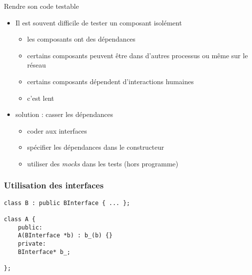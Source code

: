 \begin{frame}{Rendre son code testable}

\begin{itemize}
\itemsep1pt\parskip0pt
\item
  Il est souvent difficile de tester un composant isolément

  \begin{itemize}
  \itemsep1pt\parskip0pt
  \item
    les composants ont des dépendances
  \item
    certains composants peuvent être dans d'autres processus ou même sur
    le réseau
  \item
    certains composants  dépendent d'interactions humaines
  \item
    c'est lent
  \end{itemize}
\item
  solution : casser les dépendances

  \begin{itemize}
  \itemsep1pt\parskip0pt
  \item
    coder aux interfaces
  \item
    spécifier les dépendances dans le constructeur
  \item
    utiliser des \emph{mocks} dans les tests (hors programme)
  \end{itemize}
\end{itemize}
\end{frame}

\begin{frame}[fragile]
\frametitle{Utilisation des interfaces}
\begin{lstlisting}
class B : public BInterface { ... };

class A {
	public:
	A(BInterface *b) : b_(b) {}
	private:
	BInterface* b_;

};
\end{lstlisting}
\end{frame}


